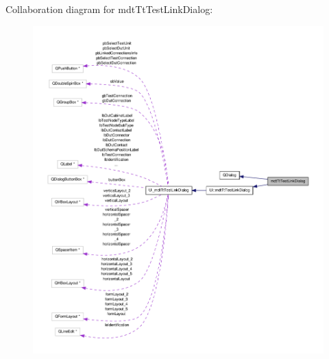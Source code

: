 Collaboration diagram for mdt\-Tt\-Test\-Link\-Dialog\-:\nopagebreak
\begin{figure}[H]
\begin{center}
\leavevmode
\includegraphics[width=350pt]{classmdt_tt_test_link_dialog__coll__graph}
\end{center}
\end{figure}

